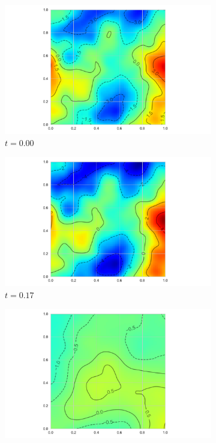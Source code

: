 \begin{figure}
	\centering
	\begin{subfigure}[b]{0.45\textwidth}
		\includegraphics[width=\textwidth]{sim_chi_example_001}
		\caption{$t=0.00$}
		\label{fig:ftsm_chi_example_0}
	\end{subfigure}             
	\begin{subfigure}[b]{0.45\textwidth}
		\includegraphics[width=\textwidth]{sim_chi_example_002}
		\caption{$t=0.17$}
	\end{subfigure}
	\vfill       
	\begin{subfigure}[b]{0.45\textwidth}
		\includegraphics[width=\textwidth]{sim_chi_example_003}

\end{subfigure}
\end{figure}
